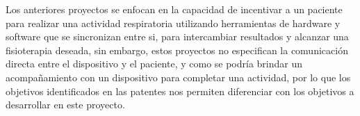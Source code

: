 Los anteriores proyectos se enfocan en la capacidad de incentivar a un paciente para realizar una actividad respiratoria utilizando herramientas de hardware y software que se sincronizan entre si, para intercambiar resultados y alcanzar una fisioterapia deseada, sin embargo, estos proyectos no especifican la comunicaci\'on directa entre el dispositivo y el paciente, y como se podr\'ia brindar un acompa\~{n}amiento con un dispositivo para completar una actividad, por lo que los objetivos identificados en las patentes nos permiten diferenciar con los objetivos a desarrollar en este proyecto.

